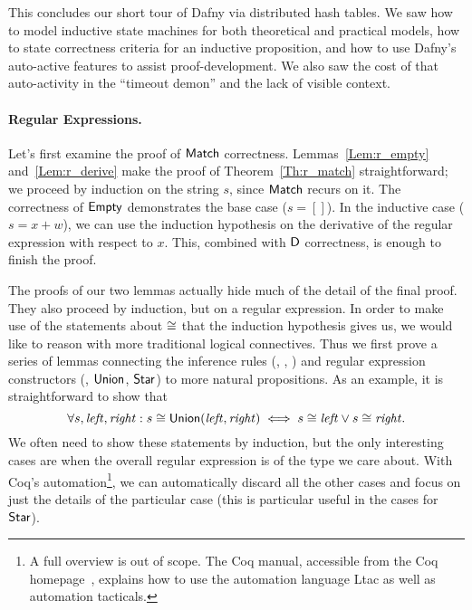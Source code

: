 This concludes our short tour of Dafny via distributed hash tables. We saw how
to model inductive state machines for both theoretical and practical models, how
to state correctness criteria for an inductive proposition, and how to use
Dafny's auto-active features to assist proof-development. We also saw the cost
of that auto-activity in the ``timeout demon'' and the lack of visible context.

\paragraph{Regular Expressions.} Let's first examine the proof of
\(\mathsf{Match}\) correctness. Lemmas~\ref{Lem:r_empty} and~\ref{Lem:r_derive}
make the proof of Theorem~\ref{Th:r_match} straightforward; we proceed by
induction on the string \(s\), since \(\mathsf{Match}\) recurs on it. The
correctness of \(\mathsf{Empty}\) demonstrates the base case (\(s = []\)). In the
inductive case (\(s = x + w\)), we can use the induction hypothesis on the
derivative of the regular expression with respect to \(x\). This, combined with
\(\mathsf{D}\) correctness, is enough to finish the proof.

The proofs of our two lemmas actually hide much of the detail of the final
proof. They also proceed by induction, but on a regular expression. In order to
make use of the statements about \(\mathrel{\cong}\) that the induction hypothesis
gives us, we would like to reason with more traditional logical connectives.
Thus we first prove a series of lemmas connecting the inference rules (\eg,
, ) and regular expression constructors (\eg,
\(\mathsf{Union}\), \(\mathsf{Star}\)) to more natural propositions. As an example,
it is straightforward to show that
\begin{equation*}
    \forall s, \mathit{left}, \mathit{right}:
    s \mathrel{\cong} \mathsf{Union}(\mathit{left}, \mathit{right})
    \iff
    s \mathrel{\cong} \mathit{left} \lor s \mathrel{\cong} \mathit{right}.
\end{equation*}
We often need to show these statements by induction, but the only interesting
cases are when the overall regular expression is of the type we care about. With
Coq's automation\footnote{A full overview is out of scope. The Coq manual,
accessible from the Coq homepage~\cite{Coq}, explains how to use the automation
language Ltac as well as automation tacticals.}, we can automatically discard
all the other cases and focus on just the details of the particular case (this
is particular useful in the cases for \(\mathsf{Star}\)).

